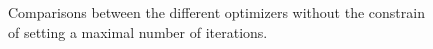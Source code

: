             \begin{figure}[t!]{}
                \centering
                \begin{subfigure}{0.45\textwidth}
                    \caption{}
                    \label{fig:cup_MSE_all_t}
                \end{subfigure}
                \begin{subfigure}{0.45\textwidth}
                    \caption{}
                    \label{fig:cup_MSE_all}
                \end{subfigure}
                \caption{Comparisons between the different optimizers without the constrain of setting a maximal
                number of iterations.}
                \label{fig:cup_MSE_all}
            \end{figure}

